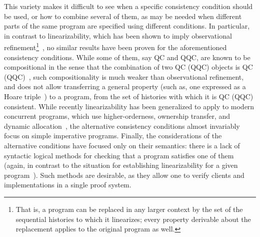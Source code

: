 %

This variety makes it difficult to see when a specific consistency
condition should be used, or how to combine several of them, as may be
needed when different parts of the same program are specified using
different conditions. In particular, in contrast to linearizability,
which has been shown to imply observational refinement\footnote{That is,
  a program can be replaced in any larger context by the set of the
  sequential histories to which it linearizes; every property
  derivable about the replacement applies to the original program as
  well.}~\cite{Filipovic-al:TCS10}, no similar results have been
proven for the aforementioned consistency conditions. While some of
them, say QC and QQC, are known to be compositional in the sense that
the combination of two QC (QQC) objects is QC
(QQC)~\cite{Herlihy-Shavit:08,Jagadeesan-Riely:ICALP14}, such
compositionality is much weaker than observational refinement, and does
not allow transferring a general property (such as, one expressed as a Hoare
triple~\cite{Turon-al:ICFP13,Liang-Feng:PLDI13}) to a program, from
the set of histories with which it is QC (QQC) consistent.
%
While recently linearizability has been generalized to apply to modern
%
concurrent programs, which use higher-orderness, ownership transfer,
and dynamic
allocation~\cite{Gotsman-Yang:CONCUR12,Cerone-al:ICALP14}, the
alternative consistency conditions almost invariably focus on 
simple imperative programs. Finally, the considerations of the
alternative conditions have focused only on their semantics: there
is a lack of syntactic logical methods for checking that a program
satisfies one of them (again, in contrast to the situation for
establishing linearizability for a given
program~\cite{OHearn-al:PODC10,Liang-Feng:PLDI13,Turon-al:ICFP13,Vafeiadis:PhD}). 
%
Such methods are desirable, as they allow one to verify clients and
implementations in a single proof system.
%


